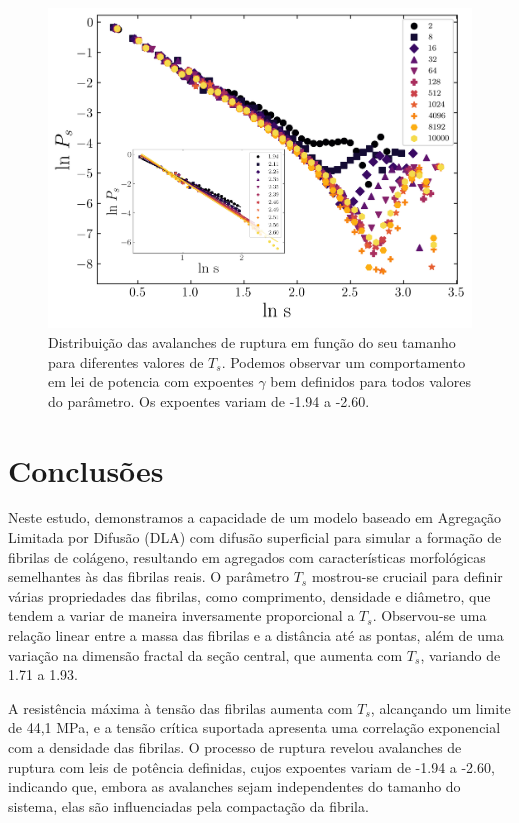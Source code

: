 \documentclass{article}
\begin{document}
    \begin{figure}[H]
        \centering
        \includegraphics[width=\textwidth]{figures/ava.png}

        \caption{Distribuição das avalanches de ruptura em função do seu tamanho para diferentes valores de \(T_{s}\).
        Podemos observar um comportamento em lei de potencia com expoentes $\gamma$ bem definidos para todos valores do 
        parâmetro. Os expoentes variam de -1.94 a -2.60.} 

        \label{R7}

    \end{figure}

\section{Conclusões}

    Neste estudo, demonstramos a capacidade de um modelo baseado em Agregação Limitada por Difusão (DLA) com difusão 
    superficial para simular a formação de fibrilas de colágeno, resultando em agregados com características morfológicas 
    semelhantes às das fibrilas reais. O parâmetro \(T_{s}\) mostrou-se cruciail para definir várias propriedades das 
    fibrilas, como comprimento, densidade e diâmetro, que tendem a variar de maneira inversamente proporcional a \(T_{s}\). 
    Observou-se uma relação linear entre a massa das fibrilas e a distância até as pontas, além de uma variação na dimensão 
    fractal da seção central, que aumenta com \(T_{s}\), variando de 1.71 a 1.93.

    A resistência máxima à tensão das fibrilas aumenta com \(T_{s}\), alcançando um limite de 44,1 MPa, e a tensão crítica 
    suportada apresenta uma correlação exponencial com a densidade das fibrilas. O processo de ruptura revelou avalanches 
    de ruptura com leis de potência definidas, cujos expoentes variam de -1.94 a -2.60, indicando que, embora as avalanches 
    sejam independentes do tamanho do sistema, elas são influenciadas pela compactação da fibrila.
\end{document}
